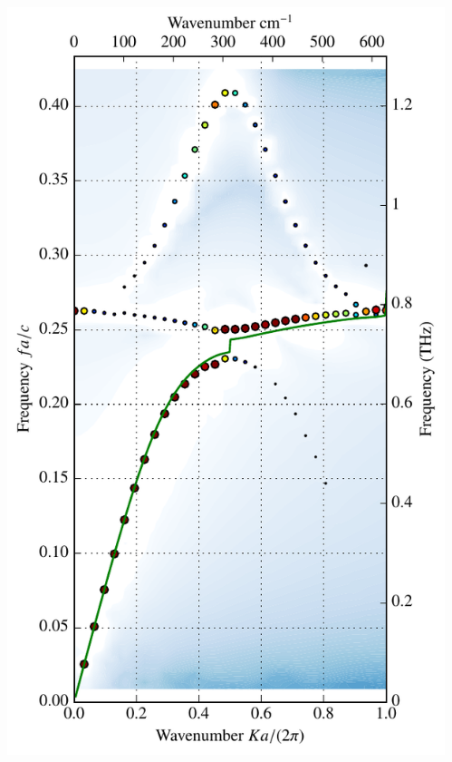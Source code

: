 \documentclass[t]{beamer} \usepackage[english]{babel} \usepackage[utf8]{inputenc} \usetheme{Frankfurt} %
\begin{document}
\begin{frame}[plain]{}
\begin{columns}[T]
\begin{column}{.55\textwidth}
	\end{column}%
	\begin{column}{.45\textwidth}%
		\vspace{-1mm}\includegraphics[height=\paperheight]{../img-cdh-new/CDH_SRRArray_14.pdf} 
	\end{column}
\end{columns}
\end{frame} 		%
\end{document}
